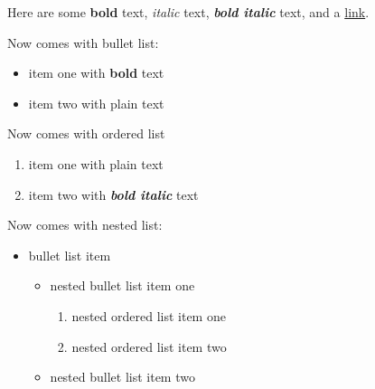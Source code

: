 Here are some \textbf{bold} text, \textit{italic} text, \textit{\textbf{bold italic}} text, and a \href{https://example.com}{link}.

Now comes with bullet list:

\begin{itemize}
\item item one with \textbf{bold} text
\item item two with plain text
\end{itemize}

Now comes with ordered list

\begin{enumerate}
\item item one with plain text
\item item two with \textit{\textbf{bold italic}} text
\end{enumerate}

Now comes with nested list:

\begin{itemize}
\item bullet list item
\begin{itemize}
\item nested bullet list item one
\begin{enumerate}
\item nested ordered list item one
\item nested ordered list item two
\end{enumerate}
\item nested bullet list item two
\end{itemize}
\end{itemize}
